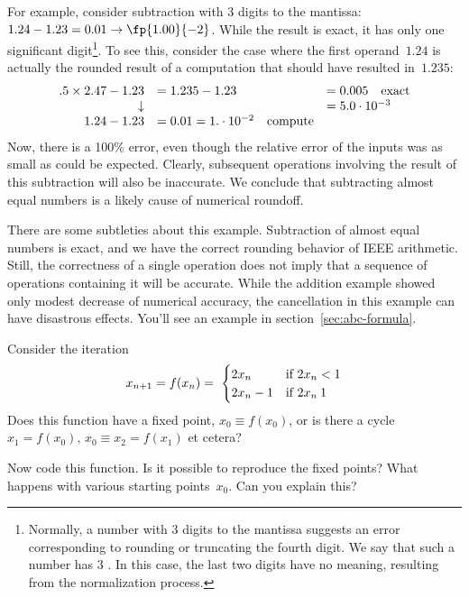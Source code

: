 For example, consider subtraction with 3 digits to the mantissa:
$1.24-1.23=0.01\rightarrow \fp{1.00}{-2}$. While the result is exact,
it has only one significant digit\footnote
{Normally, a number with 3
  digits to the mantissa suggests an error corresponding to rounding
  or truncating the fourth digit. We say that such a number has 3
  . In this case, the last two digits have no
  meaning, resulting from the normalization process.}.
To see this, consider
the case where the first operand~$1.24$ is actually the rounded result
of a computation that should have resulted in~$1.235$:
\begin{equation}
\begin{array}{rll}
  .5\times 2.47-1.23&=1.235-1.23&=0.005\quad\hbox{exact}\\
  \downarrow&&=5.0\cdot 10^{-3}\\
  1.24-1.23&=0.01=1.\cdot 10^{-2}\quad\hbox{compute}\\
\end{array}
\end{equation}
Now, there is a 100\% error, even though the relative error of the
inputs was as small as could be expected. Clearly, subsequent
operations involving the result of this subtraction will also be
inaccurate.
We conclude that subtracting almost equal numbers is a likely cause of
numerical roundoff.

There are some subtleties about this example. Subtraction of almost
equal numbers is exact, and we have the correct rounding behavior of
IEEE arithmetic. Still, the correctness of a single operation does not
imply that a sequence of operations containing it will be
accurate. While the addition example showed only modest decrease of
numerical accuracy, the cancellation in this example can have
disastrous effects. You'll see an example in section~\ref{sec:abc-formula}.

\begin{comment}
Exercise: sine function through power series. How to deal with the
alternating signs?
\end{comment}

\begin{exercise}
  Consider the iteration
  \begin{equation}
    x_{n+1}=f(x_n) = \
  \begin{cases}
    2x_n&\hbox{if $2x_n<1$}\\
    2x_n-1&\hbox{if $2x_n\>1$}\\
  \end{cases}
  \end{equation}
  Does this function have a fixed point, $x_0\equiv f(x_0)$, or is there a cycle
  $x_1=f(x_0),\,x_0\equiv x_2=f(x_1)$ et cetera?

  Now code this function. Is it possible to reproduce the fixed
  points?
  What happens with various starting
  points~$x_0$. Can you explain this?
\end{exercise}

